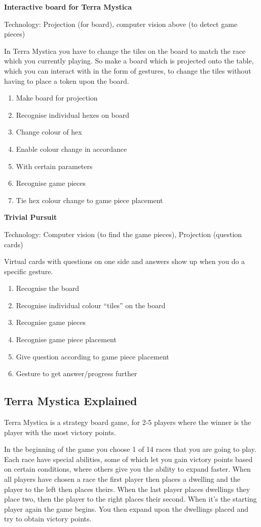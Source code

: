 \textbf{Interactive board for Terra Mystica} 

Technology: Projection (for board), computer vision above (to detect game pieces)

In Terra Mystica you have to change the tiles on the board to match the race which you currently playing. So make a board which is projected onto the table, which you can interact with in the form of gestures, to change the tiles without having to place a token upon the board.
\begin{enumerate}
\item Make board for projection
\item Recognise individual hexes on board
\item Change colour of hex
\item Enable colour change in accordance \item With certain parameters
\item Recognise game pieces
\item Tie hex colour change to game piece placement
\end{enumerate} 


\textbf{Trivial Pursuit}
 
Technology: Computer vision (to find the game pieces), Projection (question cards)

Virtual cards with questions on one side and answers show up when you do a specific gesture.
\begin{enumerate}
\item Recognise the board
\item Recognise individual colour “tiles” on the board
\item Recognise game pieces
\item Recognise game piece placement 
\item Give question according to game piece placement
\item Gesture to get answer/progress further
\end{enumerate}



\subsection{Terra Mystica Explained}

Terra Mystica is a strategy board game, for 2-5 players where the winner is the player with the most victory points. 

In the beginning of the game you choose 1 of 14 races that you are going to play. Each race have special abilities, some of which let you gain victory points based on certain conditions, where others give you the ability to expand faster. When all players have chosen a race the first player then places a dwelling and the player to the left then places theirs. When the last player places dwellings they place two, then the player to the right places their second. When it's the starting player again the game begins. You then expand upon the dwellings placed and try to obtain victory points.

